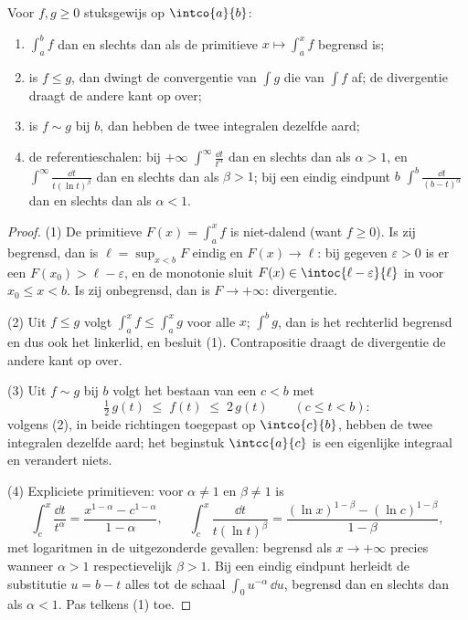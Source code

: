 \begin{theorem}\label{thm:b2:integration:comparison}
Voor $f, g \geq 0$ stuksgewijs  op $\intco{a}{b}$:
\begin{enumerate}
  \item $\int_a^b f$  dan en slechts dan als de
        primitieve $x \mapsto \int_a^x f$ begrensd is;
  \item is $f \leq g$, dan dwingt de convergentie van $\int g$ die
        van $\int f$ af; de divergentie draagt de andere kant op
        over;
  \item is $f \sim g$ bij $b$, dan hebben de twee integralen
        dezelfde aard;
  \item de referentieschalen: bij $+\infty$ 
        $\int^{\infty} \frac{\dd t}{t^\alpha}$ dan en slechts dan
        als $\alpha > 1$, en $\int^\infty \frac{\dd t}{t(\ln
        t)^\beta}$ dan en slechts dan als $\beta > 1$; bij een
        eindig eindpunt $b$  $\int^b \frac{\dd t}{(b -
        t)^\alpha}$ dan en slechts dan als $\alpha < 1$.
\end{enumerate}
\end{theorem}

\begin{proof}
(1) De primitieve $F(x) = \int_a^x f$ is niet-dalend (want $f \geq
0$). Is zij begrensd, dan is $\ell = \sup_{x < b}F$ eindig en $F(x)
\to \ell$: bij gegeven $\varepsilon > 0$ is er een $F(x_0) > \ell -
\varepsilon$, en de monotonie sluit $F(x) \in \intoc{\ell -
\varepsilon}{\ell}$ in voor $x_0 \leq x < b$. Is zij onbegrensd,
dan is $F \to +\infty$: divergentie.

(2) Uit $f \leq g$ volgt $\int_a^x f \leq \int_a^x g$ voor alle
$x$;  $\int^b g$, dan is het rechterlid begrensd en dus
ook het linkerlid, en besluit (1). Contrapositie draagt de
divergentie de andere kant op over.

(3) Uit $f \sim g$ bij $b$ volgt het bestaan van een $c < b$ met
\[
\tfrac12\,g(t) \;\leq\; f(t) \;\leq\; 2\,g(t)
\qquad (c \leq t < b) :
\]
volgens (2), in beide richtingen toegepast op $\intco{c}{b}$,
hebben de twee integralen dezelfde aard; het beginstuk
$\intcc{a}{c}$ is een eigenlijke integraal en verandert niets.

(4) Expliciete primitieven: voor $\alpha \neq 1$ en $\beta \neq 1$
is
\[
\int_c^x \frac{\dd t}{t^\alpha}
= \frac{x^{1-\alpha} - c^{1-\alpha}}{1 - \alpha},
\qquad
\int_c^x \frac{\dd t}{t(\ln t)^\beta}
= \frac{(\ln x)^{1-\beta} - (\ln c)^{1-\beta}}{1 - \beta},
\]
met logaritmen in de uitgezonderde gevallen: begrensd als $x \to
+\infty$ precies wanneer $\alpha > 1$ respectievelijk $\beta > 1$.
Bij een eindig eindpunt herleidt de substitutie $u = b - t$ alles
tot de schaal $\int_0 u^{-\alpha}\,\dd u$, begrensd dan en slechts
dan als $\alpha < 1$. Pas telkens (1) toe.
\end{proof}

